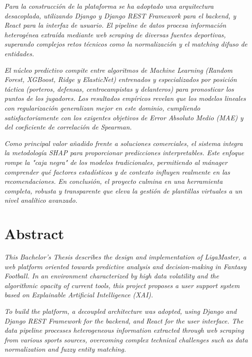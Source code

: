 \documentclass[12pt]{article}
\begin{document}
\textit{Para la construcción de la plataforma se ha adoptado una arquitectura desacoplada, utilizando Django y Django REST Framework para el backend, y React para la interfaz de usuario. El pipeline de datos procesa información heterogénea extraída mediante web scraping de diversas fuentes deportivas, superando complejos retos técnicos como la normalización y el matching difuso de entidades.}

\textit{El núcleo predictivo compite entre algoritmos de Machine Learning (Random Forest, XGBoost, Ridge y ElasticNet) entrenados y especializados por posición táctica (porteros, defensas, centrocampistas y delanteros) para pronosticar los puntos de los jugadores. Los resultados empíricos revelan que los modelos lineales con regularización generalizan mejor en este dominio, cumpliendo satisfactoriamente con los exigentes objetivos de Error Absoluto Medio (MAE) y del coeficiente de correlación de Spearman.}

\textit{Como principal valor añadido frente a soluciones comerciales, el sistema integra la metodología SHAP para proporcionar predicciones interpretables. Este enfoque rompe la "caja negra" de los modelos tradicionales, permitiendo al mánager comprender qué factores estadísticos y de contexto influyen realmente en las recomendaciones. En conclusión, el proyecto culmina en una herramienta completa, robusta y transparente que eleva la gestión de plantillas virtuales a un nivel analítico avanzado.}
\clearpage

\vspace{1.2cm}
\section*{Abstract}
\textit{This Bachelor's Thesis describes the design and implementation of LigaMaster, a web platform oriented towards predictive analysis and decision-making in Fantasy Football. In an environment characterized by high data volatility and the algorithmic opacity of current tools, this project proposes a user support system based on Explainable Artificial Intelligence (XAI).}

\textit{To build the platform, a decoupled architecture was adopted, using Django and Django REST Framework for the backend, and React for the user interface. The data pipeline processes heterogeneous information extracted through web scraping from various sports sources, overcoming complex technical challenges such as data normalization and fuzzy entity matching.}
\end{document}

